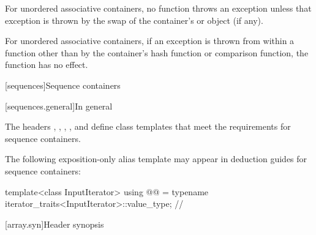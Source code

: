 \pnum
For unordered associative containers, no  function throws
an exception unless that exception is thrown by the swap of the container's
 or  object (if any).

\pnum
{}%
%
For unordered associative containers, if an exception is thrown
from within a  function other than by the container's hash
function or comparison function, the  function has no effect.

[sequences]{Sequence containers}

[sequences.general]{In general}

\pnum
The headers
,
,
,
, and
define class templates that meet the requirements for sequence containers.

\pnum
The following exposition-only alias template may appear in deduction guides for sequence containers:
\begin{codeblock}
template<class InputIterator>
  using @@ = typename iterator_traits<InputIterator>::value_type;  // \expos
\end{codeblock}

[array.syn]{Header  synopsis}

